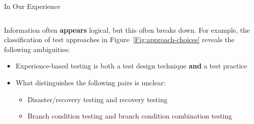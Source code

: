 \documentclass[22pt]{beamer}
\begin{document}
\begin{frame}[fragile]
\begin{textblock}{7.25}
\begin{block}{\fontsize{37}{20}\selectfont In Our Experience}
\begin{columns}
\begin{column}{0.25\textwidth}
                    Information often \textbf{appears} logical, but this often
                    breaks down. For example, the classification of test
                    approaches in Figure~\ref{Fig:approach-choices} reveals the
                    following ambiguities:
                    \begin{itemize}
                        \item Experience-based testing is both a test design
                              technique \textbf{and} a test practice
                        \item What distinguishes the following pairs is unclear:
                              \begin{itemize}
                                  \item Disaster/recovery testing and recovery
                                        testing
                                  \item Branch condition testing and branch
                                        condition combination testing
                              \end{itemize}
                    \end{itemize}
                \end{column}
            \end{columns}
            \vspace{3mm}
        \end{block}
    \end{textblock}


\end{frame}
\end{document}
